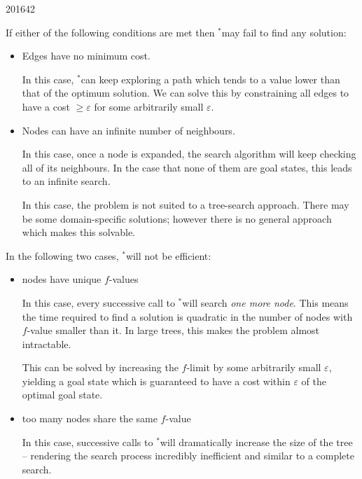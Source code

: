 \documentclass[10pt,\jkfside,a4paper]{article}
\newcommand{\idastar}{\text{IDA}\ensuremath{^*}}
\begin{document}
\begin{examquestion}{2016}{4}{2}
\begin{enumerate}[label=(\alph*)]
If either of the following conditions are met then \idastar may fail to
find any solution:
\begin{itemize}

\item Edges have no minimum cost.

In this case, \idastar can keep exploring a path which tends to a value
lower than that of the optimum solution. We can solve this by constraining
all edges to have a cost $\geq \varepsilon$ for some arbitrarily small
$\varepsilon$.

\item Nodes can have an infinite number of neighbours.

In this case, once a node is expanded, the search algorithm will keep
checking all of its neighbours. In the case that none of them are goal
states, this leads to an infinite search.

In this case, the problem is not suited to a tree-search approach. There may
be some domain-specific solutions; however there is no general approach
which makes this solvable.

\end{itemize}

In the following two cases, \idastar will not be efficient:
\begin{itemize}

\item nodes have unique $f$-values

In this case, every successive call to \idastar will search \textit{one more
node}. This means the time required to find a solution is quadratic in the
number of nodes with $f$-value smaller than it. In large trees, this makes
the problem almost intractable.

This can be solved by increasing the $f$-limit by some arbitrarily small
$\varepsilon$, yielding a goal state which is guaranteed to have a cost within
$\varepsilon$ of the optimal goal state.

\item too many nodes share the same $f$-value

In this case, successive calls to \idastar will dramatically increase the
size of the tree -- rendering the search process incredibly inefficient and
similar to a complete search.

\end{itemize}

\end{enumerate}

\end{examquestion}
\end{document}
